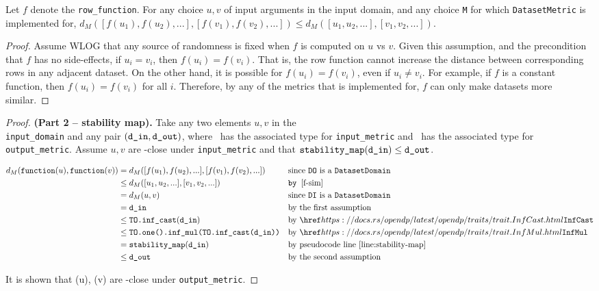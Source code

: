 \documentclass{article}
\begin{document}
\begin{lemma}
    \label{f-sim}
    Let $f$ denote the \texttt{row\_function}. 
    For any choice $u, v$ of input arguments in the input domain, and any choice \texttt{M} for which \texttt{DatasetMetric} is implemented for,
    $d_{M}([f(u_1), f(u_2), ...], [f(v_1), f(v_2), ...]) \le d_{M}([u_1, u_2, ...], [v_1, v_2, ...])$.
\end{lemma}

\begin{proof}
    Assume WLOG that any source of randomness is fixed when $f$ is computed on $u$ vs $v$.
    Given this assumption, and the precondition that $f$ has no side-effects,
    if $u_i = v_i$, then $f(u_i) = f(v_i)$. 
    That is, the row function cannot increase the distance between corresponding rows in any adjacent dataset.
    On the other hand, it is possible for $f(u_i) = f(v_i)$, even if $u_i \neq v_i$.
    For example, if $f$ is a constant function, then $f(u_i) = f(v_i)$ for all $i$.
    Therefore, by any of the metrics that  is implemented for,
    $f$ can only make datasets more similar.
\end{proof}

\begin{proof} \textbf{(Part 2 -- stability map).} 
    Take any two elements $u, v$ in the \\\texttt{input\_domain} and any pair $(\texttt{d\_in}, \texttt{d\_out})$, 
    where \din\ has the associated type for \texttt{input\_metric} and \dout\ has the associated type for \texttt{output\_metric}.
    Assume $u, v$ are \din-close under \texttt{input\_metric} and that $\texttt{stability\_map}(\texttt{d\_in}) \leq \texttt{d\_out}$. 
    
    \begin{align*}
        d_{M}(\function(u), \function(v)) &= d_{M}([f(u_1), f(u_2), ...], [f(v_1), f(v_2), ...])  && \text{since \texttt{DO} is a }\texttt{DatasetDomain}\\
        &\le d_{M}([u_1, u_2, ...], [v_1, v_2, ...]) && \texttt{by } \ref{f-sim} \\
        &= d_{M}(u, v)  && \text{since \texttt{DI} is a }\texttt{DatasetDomain} \\
        &= \din &&\text{by the first assumption} \\
        &\leq \texttt{TO.inf\_cast}(\din) &&\text{by } \rustdoc{traits/trait}{InfCast} \\
        &\leq \texttt{TO.one().inf\_mul(TO.inf\_cast(\din))} &&\text{by } \rustdoc{traits/trait}{InfMul} \\
        &=\texttt{stability\_map}(\din) &&\text{by pseudocode line } \ref{line:stability-map} \\
        &\leq \dout &&\text{by the second assumption}
    \end{align*}

    It is shown that \function(u), \function(v) are \dout-close under \texttt{output\_metric}.
\end{proof}
\end{document}
